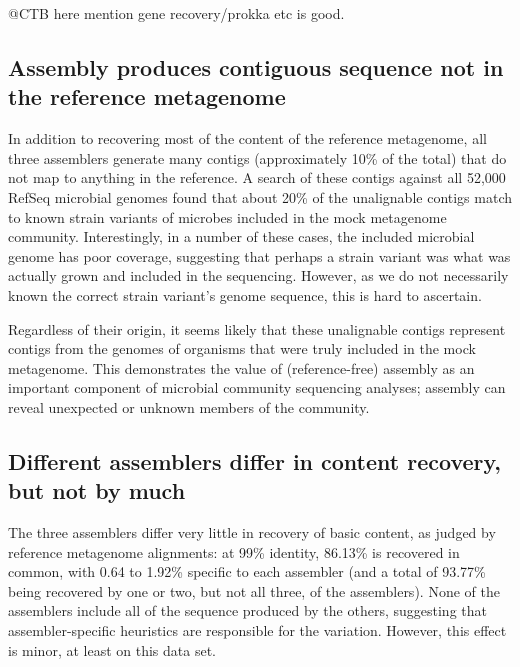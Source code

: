 \documentclass[10pt,a4paper,twocolumn]{article}
\begin{document}
@CTB here mention gene recovery/prokka etc is good.


\subsection*{Assembly produces contiguous sequence not in the reference metagenome}

In addition to recovering most of the content of the reference
metagenome, all three assemblers generate many contigs (approximately
10\% of the total) that do not map to anything in the reference.  A
search of these contigs against all 52,000 RefSeq microbial genomes found
that about 20\% of the unalignable contigs match to known strain
variants of microbes included in the mock metagenome
community.  Interestingly, in a number of these cases, the included
microbial genome has poor coverage, suggesting that perhaps a strain
variant was what was actually grown and included in the sequencing.
However, as we do not necessarily known the correct strain variant's
genome sequence, this is hard to ascertain.

Regardless of their origin, it seems likely that these unalignable
contigs represent contigs from the genomes of organisms that were
truly included in the mock metagenome.  This demonstrates the value of
(reference-free) assembly as an important component of microbial
community sequencing analyses; assembly can reveal unexpected or
unknown members of the community.

\subsection*{Different assemblers differ in content recovery, but not by much}

The three assemblers differ very little in recovery of basic content,
as judged by reference metagenome alignments: at 99\% identity, 86.13\%
is recovered in common, with 0.64 to 1.92\% specific to each assembler
(and a total of 93.77\% being recovered by one or two, but not all three,
of the assemblers). None of the assemblers include all of the sequence
produced by the others, suggesting that assembler-specific heuristics
are responsible for the variation. However, this effect is minor, at least
on this data set.
\end{document}
